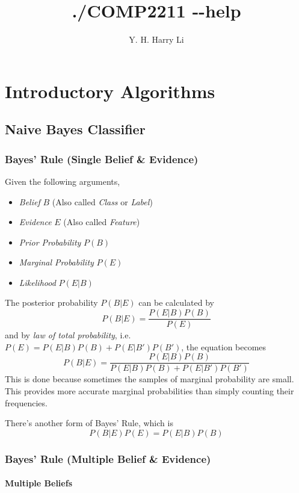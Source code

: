 \documentclass{note}
\title{./COMP2211 -\/-help}
\author{Y. H. Harry Li}
\begin{document}
\maketitle
\tableofcontents
\pagebreak

\chapter{Introductory Algorithms}

\section{Naive Bayes Classifier}

\subsection{Bayes' Rule (Single Belief \& Evidence)}

Given the following arguments,
\begin{itemize}
    \item \textit{Belief} $B$ (Also called \textit{Class} or \textit{Label})
    \item \textit{Evidence} $E$ (Also called \textit{Feature})
    \item \textit{Prior Probability} $P(B)$
    \item \textit{Marginal Probability} $P(E)$
    \item \textit{Likelihood} $P(E|B)$
\end{itemize}
The posterior probability $P(B|E)$ can be calculated by
$$
P(B|E) = \frac{P(E|B)P(B)}{P(E)}
$$
and by \textit{law of total probability}, i.e. $P(E) = P(E|B)P(B) + P(E|B')P(B')$, the equation becomes
$$
P(B|E) = \frac{P(E|B)P(B)}{P(E|B)P(B) + P(E|B')P(B')}
$$
This is done because sometimes the samples of marginal probability are small. This provides more accurate marginal probabilities than simply counting their frequencies.

\begin{tip}
There's another form of Bayes' Rule, which is
$$
P(B|E)P(E) = P(E|B)P(B)
$$
\end{tip}

\subsection{Bayes' Rule (Multiple Belief \& Evidence)}

\subsubsection{Multiple Beliefs}
\end{document}

